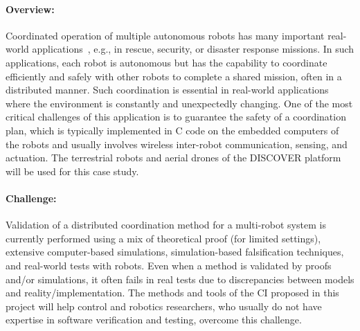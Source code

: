
\paragraph{Overview:}

Coordinated operation of multiple autonomous robots %
has many important real-world applications~\cite{multirobot2005,multirobotsurvey2013}, e.g., in rescue, security, or disaster response missions. %
In such applications, each robot is autonomous but has the capability to coordinate efficiently and safely with other robots to complete a shared mission, often in a distributed manner. %
Such coordination is essential in real-world applications where the environment is constantly and unexpectedly changing.
One of the most critical challenges of this application is to guarantee the safety of a coordination plan, which is typically implemented in C code on the embedded computers of the robots and usually involves wireless inter-robot communication, sensing, and actuation.
The terrestrial robots and aerial drones of the DISCOVER platform will be used for this case study.


\paragraph{Challenge:}
Validation of a distributed coordination method for a multi-robot system is currently performed using a mix of theoretical proof (for limited settings), extensive computer-based simulations, simulation-based falsification techniques, and real-world tests with robots.
Even when a method is validated by proofs and/or simulations, it often fails in real tests due to discrepancies between models and reality/implementation.
The methods and tools of the CI proposed in this project will help control and robotics researchers, who usually do not have expertise in software verification and testing, overcome this challenge.


